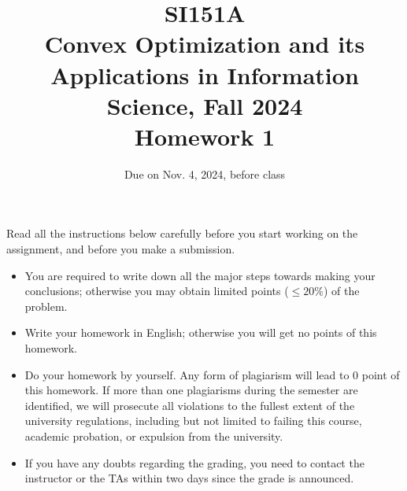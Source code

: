 \documentclass[10pt]{article}
\begin{document}
\date{
Due on Nov. 4, 2024, before class}
\title{SI151A \\ Convex Optimization and its Applications in Information Science, Fall 2024 \\
Homework 1}
\maketitle
Read all the instructions below carefully before you start working on the assignment, and before you make a submission.
\begin{itemize}
    \item You are required to write down all the major steps towards making your conclusions; otherwise you may obtain limited points ($\leq 20\%$) of the problem.
    \item Write your homework in English; otherwise you will get no points of this homework.
    \item Do your homework by yourself. Any form of plagiarism will lead to $0$ point of this homework. If more than one plagiarisms during the semester are identified, we will prosecute all violations to the fullest extent of the university regulations, including but not limited to failing this course, academic probation, or expulsion from the university.
    \item If you have any doubts regarding the grading, you need to contact the instructor or the TAs within two days since the grade is announced. 
\end{itemize}
\newpage
\end{document}
